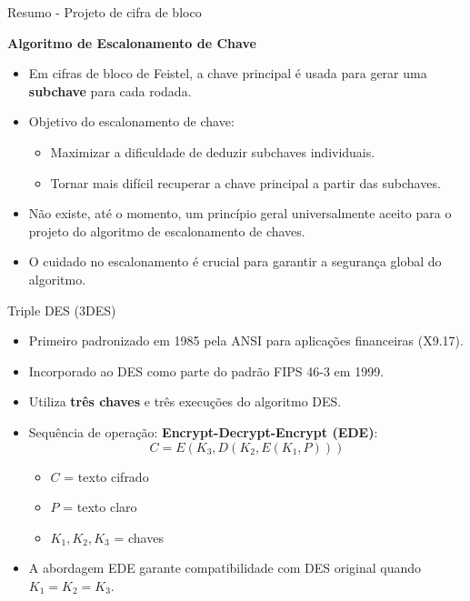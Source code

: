 \begin{frame}{Resumo - Projeto de cifra de bloco}

\textbf{Algoritmo de Escalonamento de Chave}
    \begin{itemize}
        \item Em cifras de bloco de Feistel, a chave principal é usada para gerar uma \textbf{subchave} para cada rodada.
        \item Objetivo do escalonamento de chave:
        \begin{itemize}
            \item Maximizar a dificuldade de deduzir subchaves individuais.
            \item Tornar mais difícil recuperar a chave principal a partir das subchaves.
        \end{itemize}
        \item Não existe, até o momento, um princípio geral universalmente aceito para o projeto do algoritmo de escalonamento de chaves.
        \item O cuidado no escalonamento é crucial para garantir a segurança global do algoritmo.
    \end{itemize}
\end{frame}

\begin{frame}{Triple DES (3DES)}
    \begin{itemize}
        \item Primeiro padronizado em 1985 pela ANSI para aplicações financeiras (X9.17).
        \item Incorporado ao DES como parte do padrão FIPS 46-3 em 1999.
        \item Utiliza \textbf{três chaves} e três execuções do algoritmo DES.
        \item Sequência de operação: \textbf{Encrypt-Decrypt-Encrypt (EDE)}:
        \[
            C = E(K_3, D(K_2, E(K_1, P)))
        \]
        \begin{itemize}
            \item $C$ = texto cifrado
            \item $P$ = texto claro
            \item $K_1, K_2, K_3$ = chaves
        \end{itemize}
        \item A abordagem EDE garante compatibilidade com DES original quando $K_1 = K_2 = K_3$.
    \end{itemize}
\end{frame}

